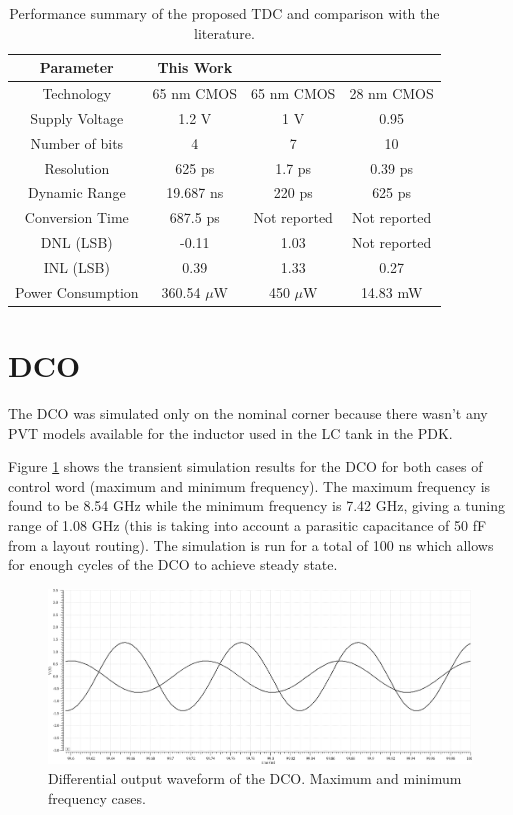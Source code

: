 \begin{table}[H]
    \centering
    \caption{Performance summary of the proposed TDC and comparison with the literature.}
    \label{tab:TDC_performance_summary}
    \begin{tabular}{|c|c|c|c|}
        \hline
        Parameter & This Work & \cite{MohammadAmin2022} & \cite{Meng2025}\\
        \hline
        Technology & 65 nm CMOS & 65 nm CMOS & 28 nm CMOS \\
        Supply Voltage & 1.2 V & 1 V & 0.95 \\
        Number of bits & 4 & 7 & 10 \\
        Resolution & 625 ps & 1.7 ps & 0.39 ps\\
        Dynamic Range & 19.687 ns & 220 ps & 625 ps \\
        Conversion Time & 687.5 ps & Not reported &  Not reported \\
        DNL (LSB) & -0.11 & 1.03 & Not reported \\
        INL (LSB) & 0.39 & 1.33 & 0.27 \\
        Power Consumption & 360.54 $\mu$W & 450 $\mu$W & 14.83 mW \\
        \hline
    \end{tabular}
\end{table}

\section{DCO}
The DCO was simulated only on the nominal corner because there wasn't any PVT models available for the inductor used in the LC tank in the PDK.

Figure \ref{fig:DCO_TRAN} shows the transient simulation results for the DCO for both cases of control word (maximum and minimum frequency). The maximum frequency is found to be
8.54 GHz while the minimum frequency is 7.42 GHz, giving a tuning range of 1.08 GHz (this is taking into account a parasitic capacitance of 50 fF from a layout routing). The simulation
is run for a total of 100 ns which allows for enough cycles of the DCO to achieve steady state.

\begin{figure}[H]
    \centering
    \includegraphics[width=1\textwidth]{figures/DCO_TRAN.png}
    \caption{Differential output waveform of the DCO. Maximum and minimum frequency cases.}
    \label{fig:DCO_TRAN}
\end{figure}

